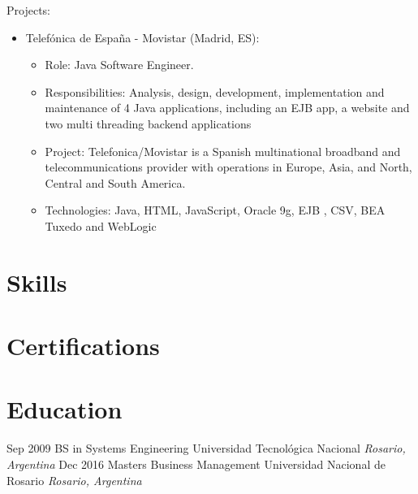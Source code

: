 \documentclass[11pt,a4paper,sans]{moderncv}        %
\begin{document}
  {
    Projects:\\
    \begin{itemize}
      \item Telefónica de España - Movistar (Madrid, ES):
        \begin{itemize}
          \item Role: Java Software Engineer. 
          \item Responsibilities:  Analysis, design, development, implementation and maintenance of 4 Java applications, including an EJB app, a website and two multi threading backend applications
          \item Project: Telefonica/Movistar is a Spanish multinational broadband and telecommunications provider with operations in Europe, Asia, and North, Central and South America.
          \item Technologies: Java, HTML, JavaScript, Oracle 9g, EJB , CSV, BEA Tuxedo and WebLogic
        \end{itemize}
    \end{itemize}
  }

\section{Skills}

\section{Certifications}

\section{Education}
\cventry
{Sep 2009}
{BS in Systems Engineering}
{Universidad Tecnológica Nacional}
{}
{\textit{Rosario, Argentina}}
{}
\cventry
{Dec 2016}
{Masters Business Management}
{Universidad Nacional de Rosario}
{}
{\textit{Rosario, Argentina}}
{}
\vspace{1mm}
\end{document}
